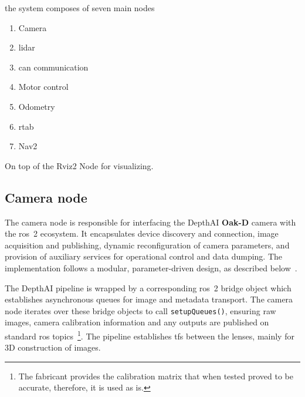 the system composes of seven main nodes

\begin{enumerate}

  \item Camera

  \item \gls{lidar}

  \item \gls{can} communication

  \item Motor control

  \item Odometry

  \item \gls{rtab}

  \item Nav2

\end{enumerate}

On top of the Rviz2 Node for visualizing.

\subsection{Camera node}

The camera node is responsible for interfacing the DepthAI \textbf{Oak-D} camera with the \gls{ros}~2 ecosystem. It encapsulates device discovery and connection, image acquisition and publishing, dynamic reconfiguration of camera parameters, and provision of auxiliary services for operational control and data dumping. The implementation follows a modular, parameter-driven design, as described below~\cite{cameranode}.

The DepthAI pipeline is wrapped by a corresponding \gls{ros}~2 bridge object which establishes asynchronous queues for image and metadata transport. The camera node iterates over these bridge objects to call \texttt{setupQueues()}, ensuring raw images, camera calibration information and any outputs are published on standard \gls{ros} topics~\footnote{The fabricant provides the calibration matrix that when tested proved to be accurate, therefore, it is used as is.}. The pipeline establishes \glspl{tf} between the lenses, mainly for 3D construction of images.

